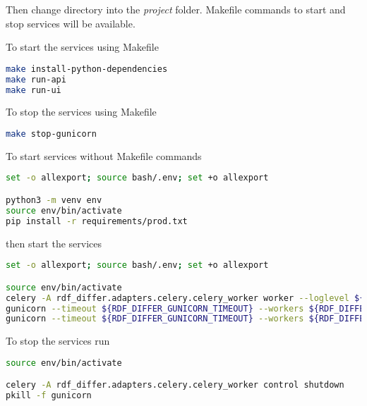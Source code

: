Then change directory into the \textit{project} folder. Makefile commands to start and stop services will be available. 	

To start the services using Makefile

\begin{lstlisting}[language=bash,]
make install-python-dependencies
make run-api
make run-ui
\end{lstlisting}

To stop the services using Makefile

\begin{lstlisting}[language=bash,]
make stop-gunicorn
\end{lstlisting}

To start services without Makefile commands

\begin{lstlisting}[language=bash,]
set -o allexport; source bash/.env; set +o allexport

python3 -m venv env
source env/bin/activate
pip install -r requirements/prod.txt
\end{lstlisting}

then start the services

\begin{lstlisting}[language=bash,]
set -o allexport; source bash/.env; set +o allexport

source env/bin/activate
celery -A rdf_differ.adapters.celery.celery_worker worker --loglevel ${RDF_DIFFER_LOG_LEVEL} --logfile ${RDF_DIFFER_CELERY_LOGS} --detach
gunicorn --timeout ${RDF_DIFFER_GUNICORN_TIMEOUT} --workers ${RDF_DIFFER_GUNICORN_API_WORKERS} --bind 0.0.0.0:${RDF_DIFFER_API_PORT} --reload rdf_differ.entrypoints.api.run:app --log-file ${RDF_DIFFER_API_LOGS} --log-level ${RDF_DIFFER_LOG_LEVEL} --daemon
gunicorn --timeout ${RDF_DIFFER_GUNICORN_TIMEOUT} --workers ${RDF_DIFFER_GUNICORN_UI_WORKERS} --bind 0.0.0.0:${RDF_DIFFER_UI_PORT} --reload rdf_differ.entrypoints.ui.run:app --log-file ${RDF_DIFFER_UI_LOGS} --log-level ${RDF_DIFFER_LOG_LEVEL} --daemon
\end{lstlisting}

To stop the services run

\begin{lstlisting}[language=bash,]
source env/bin/activate

celery -A rdf_differ.adapters.celery.celery_worker control shutdown
pkill -f gunicorn
\end{lstlisting}